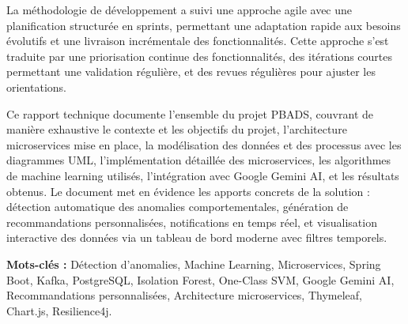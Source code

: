 La méthodologie de développement a suivi une approche agile avec une planification structurée en sprints, permettant une adaptation rapide aux besoins évolutifs et une livraison incrémentale des fonctionnalités. Cette approche s'est traduite par une priorisation continue des fonctionnalités, des itérations courtes permettant une validation régulière, et des revues régulières pour ajuster les orientations.

Ce rapport technique documente l'ensemble du projet PBADS, couvrant de manière exhaustive le contexte et les objectifs du projet, l'architecture microservices mise en place, la modélisation des données et des processus avec les diagrammes UML, l'implémentation détaillée des microservices, les algorithmes de machine learning utilisés, l'intégration avec Google Gemini AI, et les résultats obtenus. Le document met en évidence les apports concrets de la solution : détection automatique des anomalies comportementales, génération de recommandations personnalisées, notifications en temps réel, et visualisation interactive des données via un tableau de bord moderne avec filtres temporels.

\vspace{1cm}

\textbf{Mots-clés :} Détection d'anomalies, Machine Learning, Microservices, Spring Boot, Kafka, PostgreSQL, Isolation Forest, One-Class SVM, Google Gemini AI, Recommandations personnalisées, Architecture microservices, Thymeleaf, Chart.js, Resilience4j.
